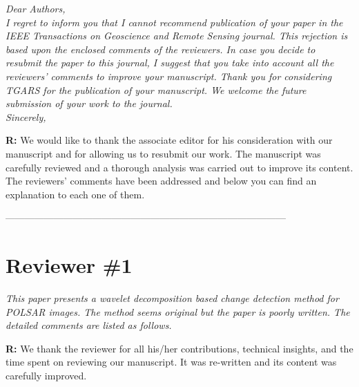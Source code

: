 \documentclass[11pt]{report}
\begin{document}
\textit{Dear Authors,\\
I regret to inform you that I cannot recommend publication of your paper in the IEEE Transactions on Geoscience and
Remote Sensing journal. This rejection is based upon the enclosed comments of the reviewers.
In case you decide to resubmit the paper to this journal, I suggest that you take into account all the reviewers’ comments
to improve your manuscript.
Thank you for considering TGARS for the publication of your manuscript. We welcome the future submission of your
work to the journal.\\
Sincerely,}

\medskip

\textbf{R:} We would like to thank the associate editor for his consideration with our manuscript and for allowing us to resubmit our work. The manuscript was carefully reviewed and a thorough analysis was carried out to improve its content. The reviewers' comments have been addressed and below you can find an explanation to each one of them.

\medskip


\newpage

\vspace{0.25cm}

\noindent---------------------------------------------------------------------------------------
\section*{Reviewer \#1}

\textit{This paper presents a wavelet decomposition based change detection method for POLSAR images. The method seems original but the paper is poorly written. The detailed comments are listed as follows.}

\medskip

\textbf{R:} We thank the reviewer for all his/her contributions, technical insights, and the time spent on reviewing our manuscript. It was re-written and its content was carefully improved.

\medskip
\end{document}
